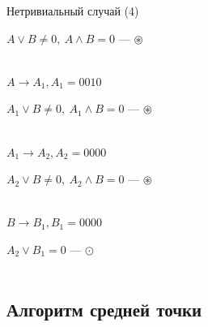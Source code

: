 \documentclass[10pt]{beamer}
\begin{document}
\begin{frame}{Нетривиальный случай (4)}
{			$A \vee B \neq 0, \ A \wedge B = 0$ --- $\circledast$ \\ ~ \\
			
			\pause
			
			$A \rightarrow A_1, A_1 = 0010$
			
			$A_1 \vee B \neq 0, \ A_1 \wedge B = 0$ --- $\circledast$ \\ ~ \\
			
			
			\pause
			
			$A_1 \rightarrow A_2, A_2 = 0000$
			
			$A_2 \vee B \neq 0, \ A_2 \wedge B = 0$ --- $\circledast$ \\ ~ \\
			
			\pause
			
			$B \rightarrow B_1, B_1 = 0000$
			
			$A_2 \vee B_1 = 0$ --- $\odot$ \\ ~ \\
			
			
		}
		
	\end{frame}
	
	\subsection{Алгоритм средней точки}
	\frame{\subsectionpage}
	
\end{document}
